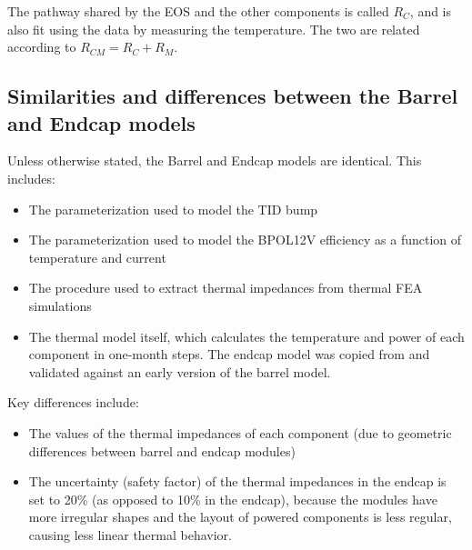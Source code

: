 The pathway shared by the EOS and the other components is called $R_{C}$, and is also fit using the
data by measuring the temperature. The two are related according to $R_{CM} = R_C + R_M$.

\subsection{Similarities and differences between the Barrel and Endcap models}

Unless otherwise stated, the Barrel and Endcap models are identical. This includes:
\begin{itemize}
  \item The parameterization used to model the TID bump
  \item The parameterization used to model the BPOL12V efficiency as a function of temperature
    and current
  \item The procedure used to extract thermal impedances from thermal FEA simulations
  \item The thermal model itself, which calculates the temperature and power of each component in 
    one-month steps. The endcap model was copied from and validated against an early version
    of the barrel model.
\end{itemize}

Key differences include:
\begin{itemize}
  \item The values of the thermal impedances of each component (due to geometric differences between
    barrel and endcap modules)
  \item The uncertainty (safety factor) of the thermal impedances in the endcap is set to 20\% (as
    opposed to 10\% in the endcap), because the modules have more irregular shapes and the layout of
    powered components is less regular, causing less linear thermal behavior.
\end{itemize}
